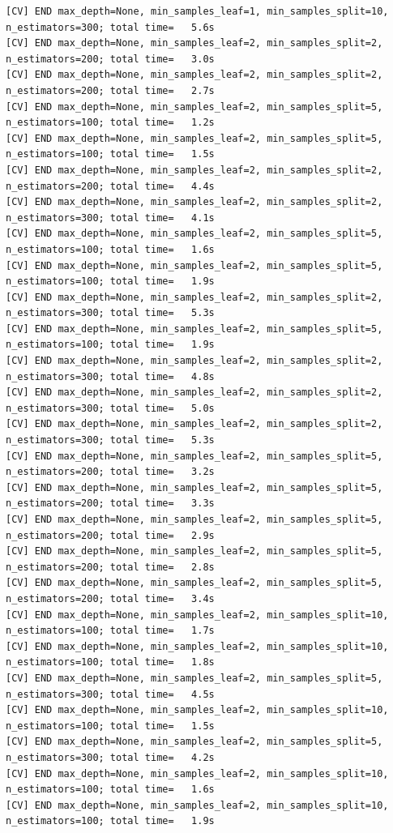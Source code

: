 \documentclass[
  11pt,
  letterpaper,
  DIV=11,
  numbers=noendperiod]{scrartcl}
\begin{document}
\begin{verbatim}
[CV] END max_depth=None, min_samples_leaf=1, min_samples_split=10, n_estimators=300; total time=   5.6s
[CV] END max_depth=None, min_samples_leaf=2, min_samples_split=2, n_estimators=200; total time=   3.0s
[CV] END max_depth=None, min_samples_leaf=2, min_samples_split=2, n_estimators=200; total time=   2.7s
[CV] END max_depth=None, min_samples_leaf=2, min_samples_split=5, n_estimators=100; total time=   1.2s
[CV] END max_depth=None, min_samples_leaf=2, min_samples_split=5, n_estimators=100; total time=   1.5s
[CV] END max_depth=None, min_samples_leaf=2, min_samples_split=2, n_estimators=200; total time=   4.4s
[CV] END max_depth=None, min_samples_leaf=2, min_samples_split=2, n_estimators=300; total time=   4.1s
[CV] END max_depth=None, min_samples_leaf=2, min_samples_split=5, n_estimators=100; total time=   1.6s
[CV] END max_depth=None, min_samples_leaf=2, min_samples_split=5, n_estimators=100; total time=   1.9s
[CV] END max_depth=None, min_samples_leaf=2, min_samples_split=2, n_estimators=300; total time=   5.3s
[CV] END max_depth=None, min_samples_leaf=2, min_samples_split=5, n_estimators=100; total time=   1.9s
[CV] END max_depth=None, min_samples_leaf=2, min_samples_split=2, n_estimators=300; total time=   4.8s
[CV] END max_depth=None, min_samples_leaf=2, min_samples_split=2, n_estimators=300; total time=   5.0s
[CV] END max_depth=None, min_samples_leaf=2, min_samples_split=2, n_estimators=300; total time=   5.3s
[CV] END max_depth=None, min_samples_leaf=2, min_samples_split=5, n_estimators=200; total time=   3.2s
[CV] END max_depth=None, min_samples_leaf=2, min_samples_split=5, n_estimators=200; total time=   3.3s
[CV] END max_depth=None, min_samples_leaf=2, min_samples_split=5, n_estimators=200; total time=   2.9s
[CV] END max_depth=None, min_samples_leaf=2, min_samples_split=5, n_estimators=200; total time=   2.8s
[CV] END max_depth=None, min_samples_leaf=2, min_samples_split=5, n_estimators=200; total time=   3.4s
[CV] END max_depth=None, min_samples_leaf=2, min_samples_split=10, n_estimators=100; total time=   1.7s
[CV] END max_depth=None, min_samples_leaf=2, min_samples_split=10, n_estimators=100; total time=   1.8s
[CV] END max_depth=None, min_samples_leaf=2, min_samples_split=5, n_estimators=300; total time=   4.5s
[CV] END max_depth=None, min_samples_leaf=2, min_samples_split=10, n_estimators=100; total time=   1.5s
[CV] END max_depth=None, min_samples_leaf=2, min_samples_split=5, n_estimators=300; total time=   4.2s
[CV] END max_depth=None, min_samples_leaf=2, min_samples_split=10, n_estimators=100; total time=   1.6s
[CV] END max_depth=None, min_samples_leaf=2, min_samples_split=10, n_estimators=100; total time=   1.9s

\end{verbatim}
\end{document}

